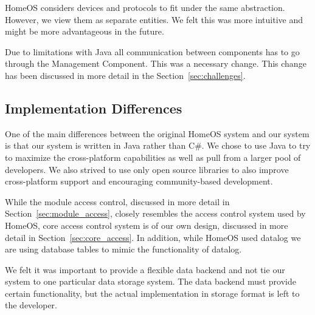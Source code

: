 HomeOS considers devices and protocols to fit under the same abstraction.
However, we view them as separate entities. We felt this was more intuitive and
might be more advantageous in the future.  

Due to limitations with Java all communication between components has to go
through the Management Component. This was a necessary change. This change has 
been discussed in more detail in the Section~\ref{sec:challenges}.
\subsection{Implementation Differences}
\label{sec:impldiff} 
One of the main differences between the original HomeOS system and our system is
that our system is written in Java rather than C\#. We chose to use Java to try
to maximize the cross-platform capabilities as well as pull from a larger pool
of developers. We also strived to use only open source libraries to also improve
cross-platform support and encouraging community-based development.

While the module access control, discussed in more detail in
Section~\ref{sec:module_access}, closely resembles the access control system
used by HomeOS, core access control system is of our own design, discussed in
more detail in Section~\ref{sec:core_access}. In addition, while HomeOS used
datalog we are using database tables to mimic the functionality of datalog.

We felt it was important to provide a flexible data backend and not tie our
system to one particular data storage system. The data backend must provide
certain functionality, but the actual implementation in storage format is left 
to the developer.
